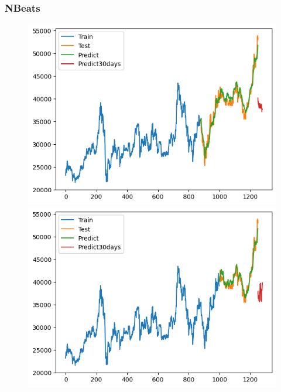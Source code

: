 \subsubsection{NBeats}
\begin{figure}[H]
    \centering
    \begin{minipage}{0.15\textwidth}
    \centering
    \includegraphics[width=1\textwidth]{resources/chapter-5/result/BIDV_NBeats_7-3.png}
    \end{minipage}
    \hfill
    \begin{minipage}{0.15\textwidth}
    \centering
    \includegraphics[width=1\textwidth]{resources/chapter-5/result/BIDV_NBeats_8-2.png}
    \end{minipage}
    \hfill
        \begin{minipage}{0.15\textwidth}

\end{minipage}
\end{figure}
